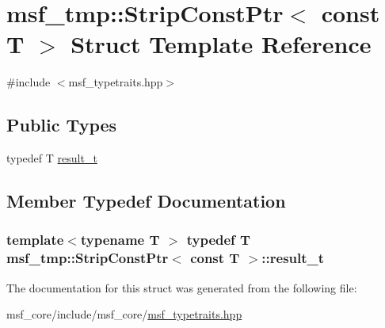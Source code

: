 \hypertarget{structmsf__tmp_1_1StripConstPtr_3_01const_01T_01_4}{\section{msf\-\_\-tmp\-:\-:Strip\-Const\-Ptr$<$ const T $>$ Struct Template Reference}
\label{structmsf__tmp_1_1StripConstPtr_3_01const_01T_01_4}
}


{\ttfamily \#include $<$msf\-\_\-typetraits.\-hpp$>$}

\subsection*{Public Types}
\begin{DoxyCompactItemize}
\item 
typedef T \hyperlink{structmsf__tmp_1_1StripConstPtr_3_01const_01T_01_4_a1c31b8f2ab8c3e038d6c0e1cd5857d18}{result\-\_\-t}
\end{DoxyCompactItemize}


\subsection{Member Typedef Documentation}
\hypertarget{structmsf__tmp_1_1StripConstPtr_3_01const_01T_01_4_a1c31b8f2ab8c3e038d6c0e1cd5857d18}{
\subsubsection[{result\-\_\-t}]{\setlength{\rightskip}{0pt plus 5cm}template$<$typename T $>$ typedef T {\bf msf\-\_\-tmp\-::\-Strip\-Const\-Ptr}$<$ const T $>$\-::{\bf result\-\_\-t}}}\label{structmsf__tmp_1_1StripConstPtr_3_01const_01T_01_4_a1c31b8f2ab8c3e038d6c0e1cd5857d18}


The documentation for this struct was generated from the following file\-:\begin{DoxyCompactItemize}
\item 
msf\-\_\-core/include/msf\-\_\-core/\hyperlink{msf__typetraits_8hpp}{msf\-\_\-typetraits.\-hpp}\end{DoxyCompactItemize}
